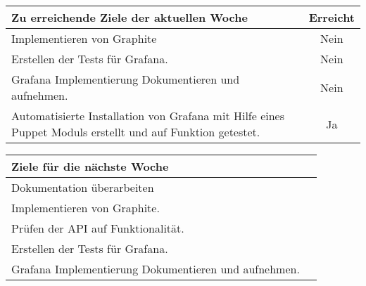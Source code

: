 \begin{tabularx}{\textwidth}{Xc}
    \arrayrulecolor{OliveGreen}
    \toprule
    {\bfseries Zu erreichende Ziele der aktuellen Woche} & {\bfseries Erreicht} \\
    \midrule[2pt]
    Implementieren von Graphite                             &Nein            \\
    \rowcolor{White}
    Erstellen der Tests für Grafana.                         &Nein            \\
    \rowcolor{OliveGreen!15}
    Grafana Implementierung Dokumentieren und aufnehmen.     &Nein            \\
    \rowcolor{White}
    Automatisierte Installation von Grafana mit Hilfe eines Puppet Moduls
    erstellt und auf Funktion getestet.   &Ja \\
    \bottomrule[2pt]
\end{tabularx}
%
\vspace{1cm}
%
\begin{tabularx}{\textwidth}{Xc}
    \arrayrulecolor{OliveGreen}
    \toprule
    {\bfseries Ziele für die nächste Woche}        &                         \\
    \midrule[2pt]
    Dokumentation überarbeiten                     &                         \\
    \rowcolor{OliveGreen!15}
    Implementieren von Graphite.                   &                          \\
    \rowcolor{White}
    Prüfen der API auf Funktionalität.             &                          \\
    \rowcolor{OliveGreen!15}
    Erstellen der Tests für Grafana.               &                          \\
    \rowcolor{White}
    Grafana Implementierung Dokumentieren und aufnehmen. &                    \\
\end{tabularx}
